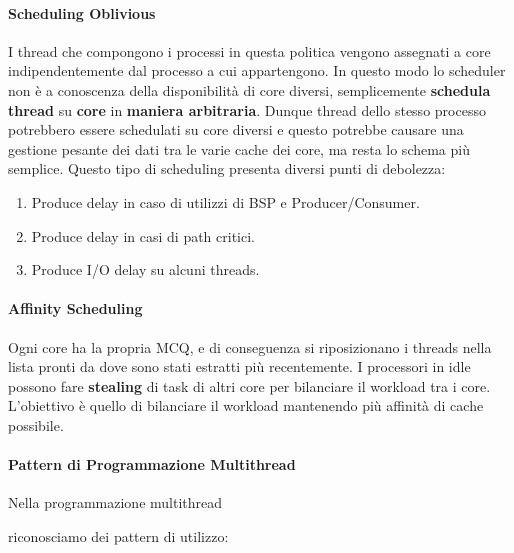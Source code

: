 \documentclass{article}
\begin{document}
\paragraph{Scheduling Oblivious} I thread che compongono i processi in questa politica vengono assegnati a core indipendentemente dal processo a cui appartengono. In questo modo lo scheduler non è a conoscenza della disponibilità di core diversi, semplicemente \textbf{schedula thread} su \textbf{core} in \textbf{maniera arbitraria}.
Dunque thread dello stesso processo potrebbero essere schedulati su core diversi e questo potrebbe causare una gestione pesante dei dati tra le varie cache dei core, ma resta lo schema più semplice.
Questo tipo di scheduling presenta diversi punti di debolezza:

\begin{enumerate}
    \item Produce delay in caso di utilizzi di BSP e Producer/Consumer.
    \item Produce delay in casi di path critici.
    \item Produce I/O delay su alcuni threads.
\end{enumerate}

\paragraph{Affinity Scheduling} Ogni core ha la propria MCQ, e di conseguenza si riposizionano i threads nella lista pronti da dove sono stati estratti più recentemente. I processori in idle possono fare \textbf{stealing} di task di altri core per bilanciare il workload tra i core. L'obiettivo è quello di bilanciare il workload mantenendo più affinità di cache possibile.

\newpage

\paragraph{Pattern di Programmazione Multithread} Nella programmazione multithread 

riconosciamo dei pattern di utilizzo:
\end{document}
